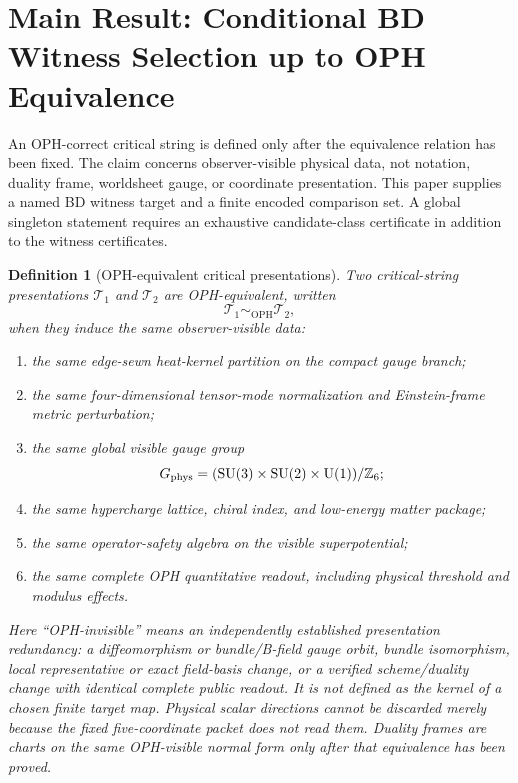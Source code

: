 \documentclass[11pt]{article}
\newtheorem{definition}[theorem]{Definition}
\theoremstyle{remark}
\theoremstyle{plain}
\newcommand{\OPH}{\mathrm{OPH}}
\newcommand{\SU}{\mathrm{SU}}
\newcommand{\U}{\mathrm{U}}
\newcommand{\Z}{\mathbb Z}
\newcommand{\Teq}{\sim_{\OPH}}
\begin{document}
\section{Main Result: Conditional BD Witness Selection up to OPH Equivalence}

An OPH-correct critical string is defined only after the equivalence relation has been fixed. The
claim concerns observer-visible physical data, not notation, duality frame, worldsheet gauge, or
coordinate presentation. This paper supplies a named BD witness target and a finite encoded comparison
set. A global singleton statement requires an exhaustive candidate-class certificate in addition to
the witness certificates.

\begin{definition}[OPH-equivalent critical presentations]
Two critical-string presentations \(\mathcal T_1\) and \(\mathcal T_2\) are OPH-equivalent,
written
\[
\mathcal T_1\Teq\mathcal T_2,
\]
when they induce the same observer-visible data:
\begin{enumerate}[leftmargin=2em]
\item the same edge-sewn heat-kernel partition on the compact gauge branch;
\item the same four-dimensional tensor-mode normalization and Einstein-frame metric perturbation;
\item the same global visible gauge group
\[
G_{\rm phys}=(\SU(3)\times\SU(2)\times\U(1))/\Z_6;
\]
\item the same hypercharge lattice, chiral index, and low-energy matter package;
\item the same operator-safety algebra on the visible superpotential;
\item the same complete OPH quantitative readout, including physical threshold and modulus
effects.
\end{enumerate}
Here ``OPH-invisible'' means an independently established presentation redundancy: a
diffeomorphism or bundle/B-field gauge orbit, bundle isomorphism, local representative or exact
field-basis change, or a verified scheme/duality change with identical complete public readout.
It is not defined as the kernel of a chosen finite target map. Physical scalar directions cannot be
discarded merely because the fixed five-coordinate packet does not read them. Duality frames
are charts on the same OPH-visible normal form only after that equivalence has been proved.
\end{definition}
\end{document}
